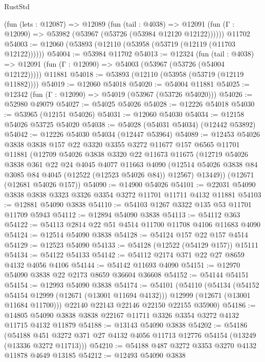 \begin{lexlean}{RustStd}
\begin{coremodule}
    (fun (lets : @12087) =>
    @12089
      (fun (tail : @4038) =>
      @12091 (fun (Γ : @12090) => @53982 (@53967 (@53726 (@53984 @12120 @12122))))))
    @11702
@54003 := @12060 (@53893 (@12110 (@53958 (@53719 (@12119 (@11703 @12122))))))
@54004 := @53984 @11702
@54013 := @12324
    (fun (tail : @4038) => @12091 (fun (Γ : @12090) => @54003 (@53967 (@53726 (@54004 @12122)))))
    @11881
@54018 := @53893 (@12110 (@53958 (@53719 (@12119 @11882))))
@54019 := @12060 @54018
@54020 := @54004 @11881
@54025 := @12342 (fun (Γ : @12090) => @54019 (@53967 (@53726 @54020)))
@54026 := @52980 @49079
@54027 := @54025 @54026
@54028 := @12226 @54018
@54030 := @53965 (@12151 @54026)
@54031 := @12060 @54030
@54034 := @12158 @54026 @53725 @54020
@54038 := @54028 (@54031 @54034) (@12442 @53892)
@54042 := @12226 @54030 @54034 (@12447 @53964)
@54089 := @12453
    @54026
    @3838
    @3838
    @157
    @22
    @3320
    @3355
    @3272
    @11677
    @157
    @6565
    @11701
    @11881
    (@12709
      @54026
      @3838
      @3320
      @22
      @11673
      @11675
      (@12719
        @54026
        @3838
        @361
        @22
        @24
        @4045
        @4077
        @11663
        @4090
        (@12514 @54026 @3838 @84 @3085 @84 @4045 (@12522 (@12523 @54026 @84)) @12567)
        @13449))
    (@12671 (@12681 @54026 @157))
@54090 := @14900 @54026
@54101 := @22031 @54090 @3838 @3838 @3323 @3326 @3354 @3272 @11701 @11711 @4132 @11881
@54103 := @12881 @54090 @3838
@54110 := @54103 @1267 @3322 @135 @53 @11701 @11709 @5943
@54112 := @12894 @54090 @3838
@54113 := @54112 @363
@54122 := @54113 @2814 @22 @51 @4514 @11700 @11708 @4106 @11683 @4090
@54124 := @12514 @54090 @3838
@54128 := @54124 @157 @22 @157 @4514
@54129 := @12523 @54090
@54133 := @54128 (@12522 (@54129 @157)) @15111
@54134 := @54122 @54133
@54142 := @54112 @2174 @371 @22 @27 @8659 @4132 @4056 @4106
@54144 := @54142 @11693 @4090
@54151 := @12970 @54090 @3838 @22 @2173 @8659 @36604 @36608
@54152 := @54144 @54151
@54154 := @12993 @54090 @3838
@54174 := @54101
    (@54110
      (@54134
        (@54152 @54154 @12999 (@12671 (@13001 @11694 @4132)))
        @12999
        (@12671 (@13001 @11684 @11700)))
      @22140
      @22143
      @22146
      @22150
      @22155
      @35900)
@54186 := @14805 @54090 @3838 @3838 @22167 @11711 @3326 @3354 @3272 @4132 @11715 @4132 @11879
@54188 := @13143 @54090 @3838
@54202 := @54186
    (@54188 @451 @3272 @371 @27 @4132 @4056 @11713 @12776 @54154 (@13249 (@13336 @3272 @11713)))
@54210 := @54188 @487 @3272 @3353 @3270 @4132 @11878 @4649 @13185
@54212 := @12493 @54090 @3838

\end{coremodule}
\end{lexlean}
